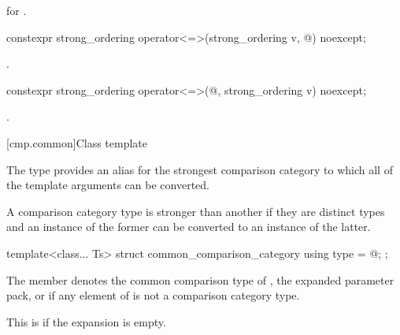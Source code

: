 \begin{itemdescr}
\pnum
\returns
{} for .
\end{itemdescr}

%
\begin{itemdecl}
constexpr strong_ordering operator<=>(strong_ordering v, @\unspec@) noexcept;
\end{itemdecl}

\begin{itemdescr}
\pnum
\returns
{}.
\end{itemdescr}

%
\begin{itemdecl}
constexpr strong_ordering operator<=>(@\unspec@, strong_ordering v) noexcept;
\end{itemdecl}

\begin{itemdescr}
\pnum
\returns
{}.
\end{itemdescr}

[cmp.common]{Class template }

\pnum
The type  provides an alias for
the strongest comparison category
to which all of the template arguments can be converted.
\begin{note}
A comparison category type is stronger than another if
they are distinct types and an instance of the former
can be converted to an instance of the latter.
\end{note}

%
\begin{itemdecl}
template<class... Ts>
struct common_comparison_category {
  using type = @\seebelow@;
};
\end{itemdecl}

\begin{itemdescr}
\pnum
\remarks
The member   denotes
the common comparison type of ,
the expanded parameter pack, or
 if any element of 
is not a comparison category type.
\begin{note}
This is  if the expansion is empty.
\end{note}
\end{itemdescr}

